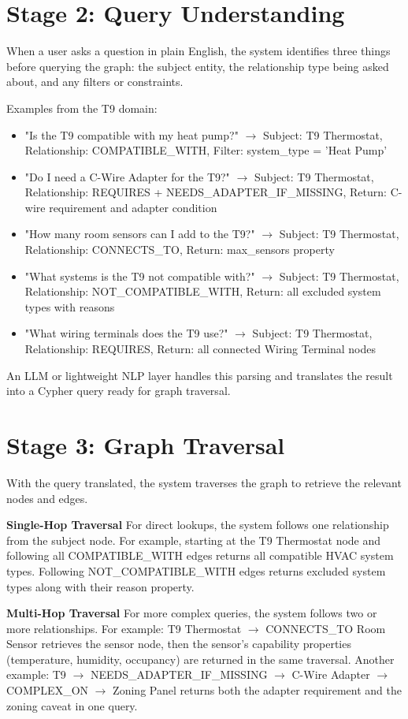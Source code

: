 \documentclass[11pt,a4paper]{article}
\begin{document}
\section{Stage 2: Query Understanding}
When a user asks a question in plain English, the system identifies three things before querying the graph: the subject entity, the relationship type being asked about, and any filters or constraints.

Examples from the T9 domain:
\begin{itemize}
    \item "Is the T9 compatible with my heat pump?" $\rightarrow$ Subject: T9 Thermostat, Relationship: COMPATIBLE\_WITH, Filter: system\_type = 'Heat Pump'
    \item "Do I need a C-Wire Adapter for the T9?" $\rightarrow$ Subject: T9 Thermostat, Relationship: REQUIRES + NEEDS\_ADAPTER\_IF\_MISSING, Return: C-wire requirement and adapter condition
    \item "How many room sensors can I add to the T9?" $\rightarrow$ Subject: T9 Thermostat, Relationship: CONNECTS\_TO, Return: max\_sensors property
    \item "What systems is the T9 not compatible with?" $\rightarrow$ Subject: T9 Thermostat, Relationship: NOT\_COMPATIBLE\_WITH, Return: all excluded system types with reasons
    \item "What wiring terminals does the T9 use?" $\rightarrow$ Subject: T9 Thermostat, Relationship: REQUIRES, Return: all connected Wiring Terminal nodes
\end{itemize}

An LLM or lightweight NLP layer handles this parsing and translates the result into a Cypher query ready for graph traversal.

\section{Stage 3: Graph Traversal}
With the query translated, the system traverses the graph to retrieve the relevant nodes and edges.

\textbf{Single-Hop Traversal}
For direct lookups, the system follows one relationship from the subject node. For example, starting at the T9 Thermostat node and following all COMPATIBLE\_WITH edges returns all compatible HVAC system types. Following NOT\_COMPATIBLE\_WITH edges returns excluded system types along with their reason property.

\textbf{Multi-Hop Traversal}
For more complex queries, the system follows two or more relationships. For example: T9 Thermostat $\rightarrow$ CONNECTS\_TO Room Sensor retrieves the sensor node, then the sensor's capability properties (temperature, humidity, occupancy) are returned in the same traversal. Another example: T9 $\rightarrow$ NEEDS\_ADAPTER\_IF\_MISSING $\rightarrow$ C-Wire Adapter $\rightarrow$ COMPLEX\_ON $\rightarrow$ Zoning Panel returns both the adapter requirement and the zoning caveat in one query.
\end{document}
